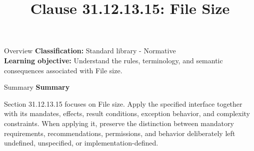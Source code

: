 \documentclass[10pt,letterpaper]{article}
\title{Clause 31.12.13.15: File Size}
\author{}
\date{}
\begin{document}
\maketitle
\begin{CornellOverviewBox}{Overview}
\textbf{Classification:} Standard library - Normative\\[2pt]
\textbf{Learning objective:} Understand the rules, terminology, and semantic consequences associated with File size.
\end{CornellOverviewBox}\begin{CornellSummaryBox}{Summary}
{\sffamily\bfseries\color{Accent} Summary}\par\vspace{3pt}Section 31.12.13.15 focuses on File size. Apply the specified interface together with its mandates, effects, result conditions, exception behavior, and complexity constraints. When applying it, preserve the distinction between mandatory requirements, recommendations, permissions, and behavior deliberately left undefined, unspecified, or implementation-defined.
\end{CornellSummaryBox}
\end{document}

